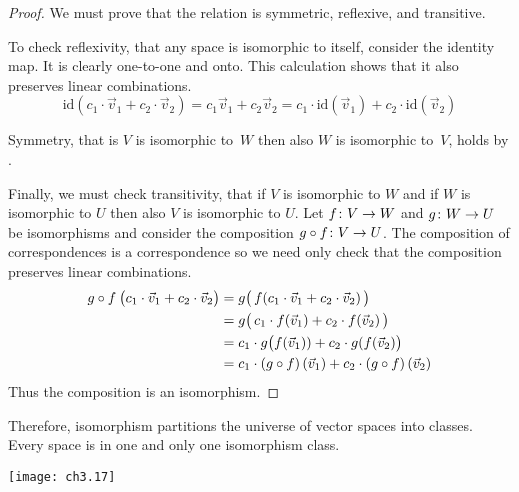 \begin{proof}
We must prove that the relation is
symmetric, reflexive, and transitive.

To check reflexivity, that any space is isomorphic to itself,
consider the identity map.
It is clearly one-to-one and onto. 
This calculation shows that
it also preserves linear combinations.
\begin{equation*}
   \mbox{id}(c_1\cdot \vec{v}_1+c_2\cdot \vec{v}_2)
   =c_1\vec{v}_1+c_2\vec{v}_2
   =c_1\cdot \mbox{id}(\vec{v}_1)+c_2\cdot \mbox{id}(\vec{v}_2)
\end{equation*}

Symmetry, that is $V$ is isomorphic to~$W$ then also
$W$ is isomorphic to~$V$, holds by .

Finally, we must check transitivity, that if $V$ is isomorphic to $W$ 
and if $W$ is isomorphic to $U$ then also 
$V$ is isomorphic to $U$.
Let $\mbox{$f\colon V\to W$}$ and $\mbox{$g\colon W\to U$}$ be isomorphisms and
consider the composition $\mbox{$g\mathbin\circ f\colon V\to U$}$.
The composition of correspondences is a correspondence
so we need only check that the composition preserves linear combinations.
\begin{align*}
  g\mathbin\circ f\:\bigl(c_1\cdot\vec{v}_1+c_2\cdot\vec{v}_2\bigr)
     &=g\bigl(\,f(c_1\cdot \vec{v}_1+c_2\cdot\vec{v}_2)\,\bigr)        \\
     &=g\bigl(\,c_1\cdot f(\vec{v}_1)+c_2\cdot f(\vec{v}_2)\,\bigr) \\ 
     &=c_1\cdot g\bigl(f(\vec{v}_1))+c_2\cdot g(f(\vec{v}_2)\bigr)  \\
     &=c_1\cdot(g\mathbin\circ f)\,(\vec{v}_1)
                  +c_2\cdot(g\mathbin\circ f)\,(\vec{v}_2)
\end{align*}
Thus the composition is an isomorphism.
\end{proof}

Therefore, isomorphism partitions the universe of vector spaces 
into classes.
Every space is in one and only one isomorphism class.
\begin{center} \small
  \texttt{[image: ch3.17]}
\end{center}

